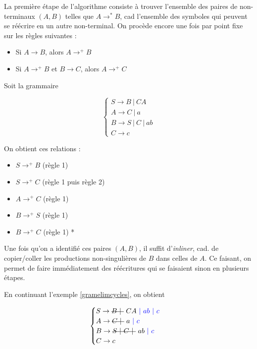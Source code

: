 La première étape de l'algorithme consiste à trouver l'ensemble des paires de non-terminaux $(A,B)$ telles que $A \rightarrow^* B$, cad l'ensemble des symboles qui peuvent se réécrire en un autre non-terminal. On procède encore une fois par point fixe sur les règles suivantes : 

\begin{itemize}
\item Si $A \rightarrow B$, alors $A \rightarrow^+ B$
\item Si $A \rightarrow^+ B$ et $B \rightarrow C$, alors $A \rightarrow^+ C$
\end{itemize}

\begin{example}
\label{gramelimcycles}
Soit la grammaire 

\[
\begin{cases}
S \rightarrow B~|~CA \\
A \rightarrow C~|~a \\
B \rightarrow S~|~C~|~ab \\
C \rightarrow c 
\end{cases}
\]

On obtient ces relations :

\begin{itemize}
\item $S \rightarrow^+ B$ (règle 1)
\item $S \rightarrow^+ C$ (règle 1 puis règle 2)
\item $A \rightarrow^+ C$ (règle 1)
\item $B \rightarrow^+ S$ (règle 1)
\item $B \rightarrow^+ C$ (règle 1)
*\end{itemize}

\end{example}

Une fois qu'on a identifié ces paires $(A,B)$, il suffit d'\textit{inliner}, cad. de copier/coller les productions non-singulières de $B$ dans celles de $A$. Ce faisant, on permet de faire immédiatement des réécritures qui se faisaient sinon en plusieurs étapes. 

\begin{example}
En continuant l'exemple \ref{gramelimcycles}, on obtient 

\[
\begin{cases}
S \rightarrow \text{\st{$B~|~$}}~CA \textcolor{blue}{~|~ab~|~c} \\
A \rightarrow \text{\st{$C~|~$}}~a \textcolor{blue}{~|~c}\\
B \rightarrow \text{\st{$S~|~C~|~$}}~ab \textcolor{blue}{~|~c} \\
C \rightarrow c
\end{cases}
\]

\end{example}


